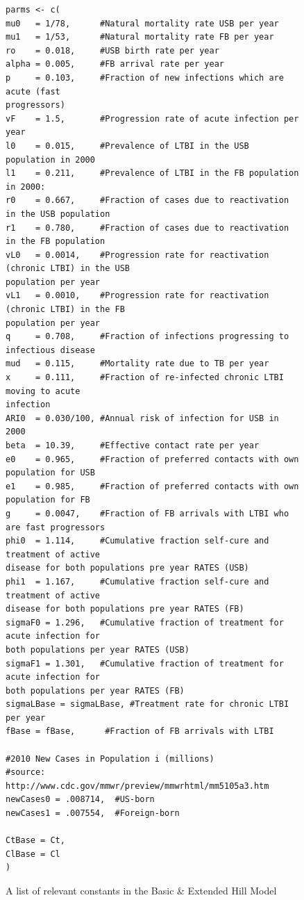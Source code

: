 \documentclass{amsart}
\begin{document}
\begin{figure}[h]
\begin{center}
{\begin{verbatim}
parms <- c(
mu0   = 1/78,      #Natural mortality rate USB per year
mu1   = 1/53,      #Natural mortality rate FB per year
ro    = 0.018,     #USB birth rate per year
alpha = 0.005,     #FB arrival rate per year
p     = 0.103,     #Fraction of new infections which are acute (fast
progressors)
vF    = 1.5,       #Progression rate of acute infection per year
l0    = 0.015,     #Prevalence of LTBI in the USB population in 2000
l1    = 0.211,     #Prevalence of LTBI in the FB population in 2000: 
r0    = 0.667,     #Fraction of cases due to reactivation in the USB population
r1    = 0.780,     #Fraction of cases due to reactivation in the FB population
vL0   = 0.0014,    #Progression rate for reactivation (chronic LTBI) in the USB
population per year
vL1   = 0.0010,    #Progression rate for reactivation (chronic LTBI) in the FB
population per year
q     = 0.708,     #Fraction of infections progressing to infectious disease
mud   = 0.115,     #Mortality rate due to TB per year
x     = 0.111,     #Fraction of re-infected chronic LTBI moving to acute
infection
ARI0  = 0.030/100, #Annual risk of infection for USB in 2000
beta  = 10.39,     #Effective contact rate per year
e0    = 0.965,     #Fraction of preferred contacts with own population for USB
e1    = 0.985,     #Fraction of preferred contacts with own population for FB
g     = 0.0047,    #Fraction of FB arrivals with LTBI who are fast progressors
phi0  = 1.114,     #Cumulative fraction self-cure and treatment of active
disease for both populations pre year RATES (USB)
phi1  = 1.167,     #Cumulative fraction self-cure and treatment of active
disease for both populations pre year RATES (FB)
sigmaF0 = 1.296,   #Cumulative fraction of treatment for acute infection for
both populations per year RATES (USB)
sigmaF1 = 1.301,   #Cumulative fraction of treatment for acute infection for
both populations per year RATES (FB)
sigmaLBase = sigmaLBase, #Treatment rate for chronic LTBI per year
fBase = fBase,      #Fraction of FB arrivals with LTBI

#2010 New Cases in Population i (millions)
#source: http://www.cdc.gov/mmwr/preview/mmwrhtml/mm5105a3.htm
newCases0 = .008714,  #US-born
newCases1 = .007554,  #Foreign-born

CtBase = Ct,
ClBase = Cl
)
    \end{verbatim}
  }
  \end{center}
  \caption{A list of relevant constants in the Basic \& Extended Hill Model}
  \label{fig:basicHillConstants}
\end{figure}
\end{document}
